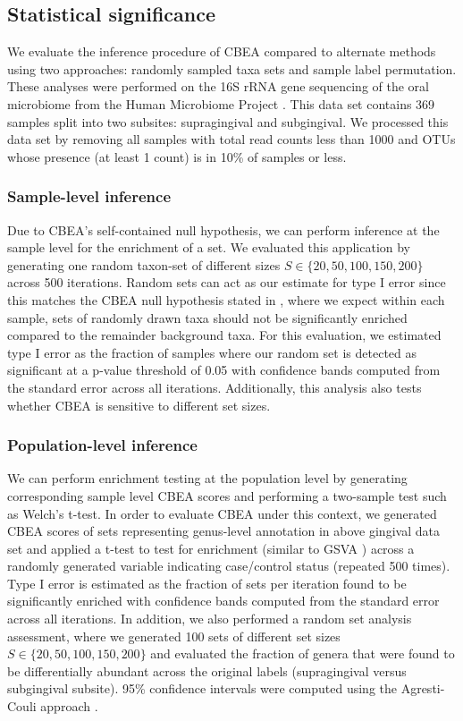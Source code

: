 \documentclass[10pt,letterpaper]{article}
\begin{document}
\subsection*{Statistical significance}
We evaluate the inference procedure of CBEA compared to alternate methods using two approaches: randomly sampled taxa sets and sample label permutation. These analyses were performed on the 16S rRNA gene sequencing of the oral microbiome from the Human Microbiome Project \cite{consortium2012, proctor2019}. This data set contains 369 samples split into two subsites: supragingival and subgingival. We processed this data set by removing all samples with total read counts less than 1000 and OTUs whose presence (at least 1 count) is in 10\% of samples or less.  

\subsubsection*{Sample-level inference} 
Due to CBEA's self-contained null hypothesis, we can perform inference at the sample level for the enrichment of a set. We evaluated this application by generating one random taxon-set of different sizes $S \in \{20, 50, 100, 150, 200\}$ across 500 iterations. Random sets can act as our estimate for type I error since this matches the CBEA null hypothesis stated in , where we expect within each sample, sets of randomly drawn taxa should not be significantly enriched compared to the remainder background taxa. For this evaluation, we estimated type I error as the fraction of samples where our random set is detected as significant at a p-value threshold of 0.05 with confidence bands computed from the standard error across all iterations.  Additionally, this analysis also tests whether CBEA is sensitive to different set sizes.  

\subsubsection*{Population-level inference} 
We can perform enrichment testing at the population level by generating corresponding sample level CBEA scores and performing a two-sample test such as Welch's t-test. In order to evaluate CBEA under this context, we generated CBEA scores of sets representing genus-level annotation in above gingival data set \cite{consortium2012, proctor2019} and applied a t-test to test for enrichment (similar to GSVA \cite{hanzelmann2013}) across a randomly generated variable indicating case/control status (repeated 500 times). Type I error is estimated as the fraction of sets per iteration found to be significantly enriched with confidence bands computed from the standard error across all iterations. In addition, we also performed a random set analysis assessment, where we generated 100 sets of different set sizes $S \in \{20, 50, 100, 150, 200\}$ and evaluated the fraction of genera that were found to be differentially abundant across the original labels (supragingival versus subgingival subsite). 95\% confidence intervals were computed using the Agresti-Couli approach \cite{agresti1998}.  
\end{document}
